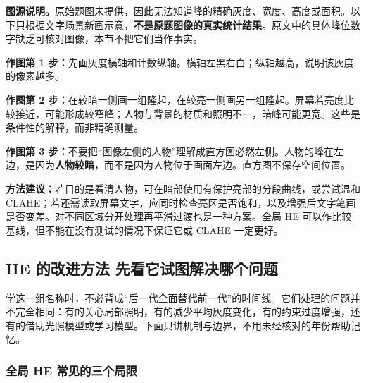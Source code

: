\textbf{图源说明。}原始题图未提供，因此无法知道峰的精确灰度、宽度、高度或面积。以下只根据文字场景新画示意，\textbf{不是原题图像的真实统计结果}。原文中的具体峰位数字缺乏可核对图像，本节不把它们当作事实。

\begin{center}
\end{center}

\textbf{作图第 1 步：}先画灰度横轴和计数纵轴。横轴左黑右白；纵轴越高，说明该灰度的像素越多。

\textbf{作图第 2 步：}在较暗一侧画一组隆起，在较亮一侧画另一组隆起。屏幕若亮度比较接近，可能形成较窄峰；人物与背景的材质和照明不一，暗峰可能更宽。这些是条件性的解释，而非精确测量。

\textbf{作图第 3 步：}不要把“图像左侧的人物”理解成直方图必然左侧。人物的峰在左边，是因为\textbf{人物较暗}，而不是因为人物位于画面左边。直方图不保存空间位置。

\textbf{方法建议：}若目的是看清人物，可在暗部使用有保护亮部的分段曲线，或尝试温和 CLAHE；若还需读取屏幕文字，应同时检查亮区是否饱和，以及增强后文字笔画是否变差。对不同区域分开处理再平滑过渡也是一种方案。全局 HE 可以作比较基线，但不能在没有测试的情况下保证它或 CLAHE 一定更好。

\subsection{HE 的改进方法 先看它试图解决哪个问题}

学这一组名称时，不必背成“后一代全面替代前一代”的时间线。它们处理的问题并不完全相同：有的关心局部照明，有的减少平均灰度变化，有的约束过度增强，还有的借助光照模型或学习模型。下面只讲机制与边界，不用未经核对的年份帮助记忆。

\subsubsection*{全局 HE 常见的三个局限}

